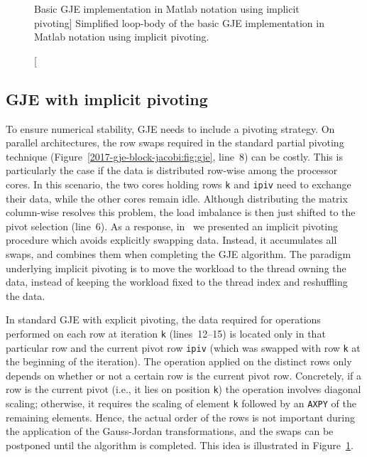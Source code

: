\begin{figure}[t]

\caption
[Basic GJE implementation in Matlab notation using implicit pivoting]
{Simplified loop-body of the basic GJE implementation in Matlab
    notation using implicit pivoting.}
\label{2017-gje-block-jacobi:fig:gje2}
\end{figure}

\subsection{GJE with implicit pivoting}\label{2017-gje-block-jacobi:sec:implicit-pivoting}
To ensure numerical stability, GJE needs to {include} a pivoting strategy.
On parallel architectures, the row swaps required
in the standard partial pivoting technique (Figure~\ref{2017-gje-block-jacobi:fig:gje}, line~8)
can be costly.
This is particularly the case if the data is distributed row-wise
among the processor cores.
In this {scenario}, the two cores holding rows \texttt{k} and \texttt{ipiv}
need to exchange their data, while the other cores remain idle.
Although distributing the matrix column-wise resolves this problem,
the load imbalance is then just shifted to the pivot selection (line~6).
As a response, in~\cite{Anzt:2017:BGE:3026937.3026940}
we {presented} an implicit pivoting procedure
which avoids explicitly swapping data.
Instead, it accumulates all swaps, and combines them
when completing the GJE algorithm.
The paradigm underlying implicit pivoting is to move the {workload to the thread owning the data}, instead of 
keeping the workload fixed to the thread index and reshuffling the data.

In {standard GJE with} explicit pivoting, the data required for operations 
performed on each row at iteration \texttt{k} (lines~12--15)
is located only in that particular row
and the current pivot row \texttt{ipiv}
(which was swapped with row \texttt{k} at the beginning of the iteration).
The operation applied on the distinct rows only depends
on whether or not a certain row is the current pivot row.
{Concretely}, if a row is the current pivot (i.e., it lies on position \texttt{k})
the operation involves diagonal scaling;
otherwise, it requires the scaling of element \texttt{k} followed by an \texttt{AXPY}
of the remaining elements.
Hence, the actual order of the rows
is not important during the application of the Gauss-Jordan transformations,
and the swaps can be postponed until the algorithm is completed.
This idea is illustrated in Figure~\ref{2017-gje-block-jacobi:fig:gje2}.


